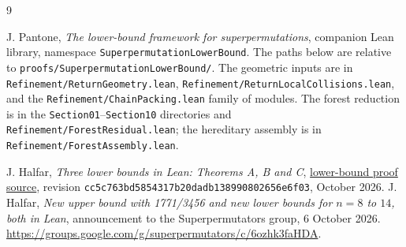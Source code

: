 \begin{thebibliography}{9}
\raggedright
{}
J. Pantone, \emph{The lower-bound framework for superpermutations},
companion Lean library, namespace \nolinkurl{SuperpermutationLowerBound}.
The paths below are relative to
\nolinkurl{proofs/SuperpermutationLowerBound/}.
The geometric inputs are in \nolinkurl{Refinement/ReturnGeometry.lean},
\nolinkurl{Refinement/ReturnLocalCollisions.lean}, and the
\nolinkurl{Refinement/ChainPacking.lean} family of modules.
The forest reduction is in the \nolinkurl{Section01}--\nolinkurl{Section10}
directories and \nolinkurl{Refinement/ForestResidual.lean}; the hereditary
assembly is in \nolinkurl{Refinement/ForestAssembly.lean}.

J. Halfar, \emph{Three lower bounds in Lean: Theorems A, B and C},
\href{https://github.com/jhalfar/superpermutations/tree/cc5c763bd5854317b20dadb138990802656e6f03/proofs/lean/lower}{lower-bound proof source},
revision \nolinkurl{cc5c763bd5854317b20dadb138990802656e6f03},
October 2026.
J. Halfar, \emph{New upper bound with 1771/3456 and new lower bounds
for $n=8$ to $14$, both in Lean}, announcement to the Superpermutators
group, 6 October 2026.
\url{https://groups.google.com/g/superpermutators/c/6ozhk3faHDA}.
\end{thebibliography}
